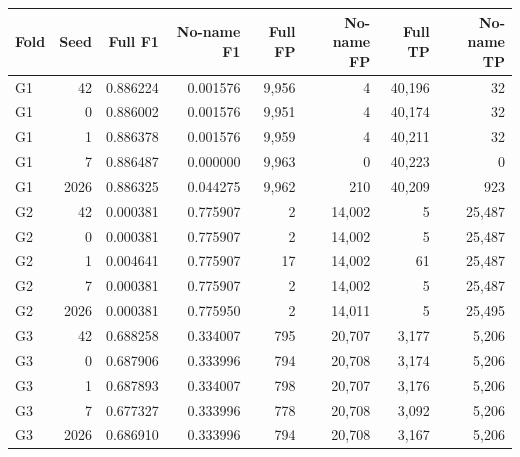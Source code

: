 \centering\footnotesize
\begin{tabular}{@{}lrrrrrrr@{}}
\toprule
Fold & Seed & Full F1 & No-name F1 & Full FP & No-name FP & Full TP & No-name TP\\\midrule
G1 & 42 & 0.886224 & 0.001576 & 9,956 & 4 & 40,196 & 32\\
G1 & 0 & 0.886002 & 0.001576 & 9,951 & 4 & 40,174 & 32\\
G1 & 1 & 0.886378 & 0.001576 & 9,959 & 4 & 40,211 & 32\\
G1 & 7 & 0.886487 & 0.000000 & 9,963 & 0 & 40,223 & 0\\
G1 & 2026 & 0.886325 & 0.044275 & 9,962 & 210 & 40,209 & 923\\
G2 & 42 & 0.000381 & 0.775907 & 2 & 14,002 & 5 & 25,487\\
G2 & 0 & 0.000381 & 0.775907 & 2 & 14,002 & 5 & 25,487\\
G2 & 1 & 0.004641 & 0.775907 & 17 & 14,002 & 61 & 25,487\\
G2 & 7 & 0.000381 & 0.775907 & 2 & 14,002 & 5 & 25,487\\
G2 & 2026 & 0.000381 & 0.775950 & 2 & 14,011 & 5 & 25,495\\
G3 & 42 & 0.688258 & 0.334007 & 795 & 20,707 & 3,177 & 5,206\\
G3 & 0 & 0.687906 & 0.333996 & 794 & 20,708 & 3,174 & 5,206\\
G3 & 1 & 0.687893 & 0.334007 & 798 & 20,707 & 3,176 & 5,206\\
G3 & 7 & 0.677327 & 0.333996 & 778 & 20,708 & 3,092 & 5,206\\
G3 & 2026 & 0.686910 & 0.333996 & 794 & 20,708 & 3,167 & 5,206\\
\bottomrule
\end{tabular}
